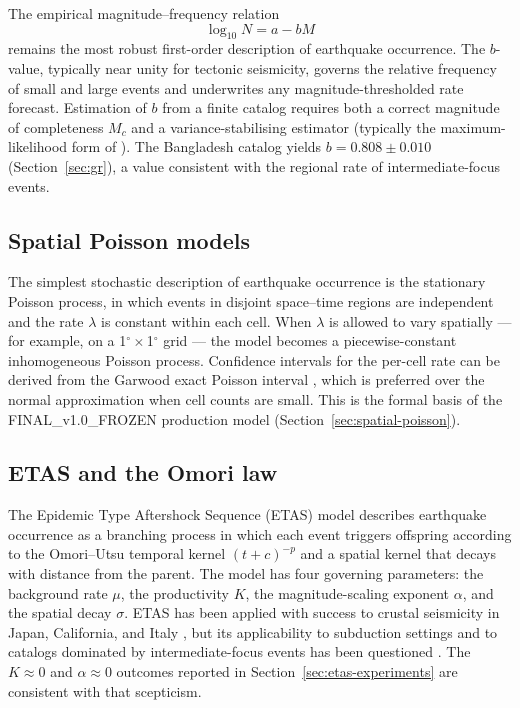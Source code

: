 \documentclass[10pt,a4paper,twocolumn]{article}
\begin{document}
The empirical magnitude--frequency relation
\begin{equation}\label{eq:gr}
\log_{10} N = a - bM
\end{equation}
\cite{gutenberg1944} remains the most robust first-order description of earthquake occurrence. The $b$-value, typically near unity for tectonic seismicity, governs the relative frequency of small and large events and underwrites any magnitude-thresholded rate forecast. Estimation of $b$ from a finite catalog requires both a correct magnitude of completeness $M_c$ and a variance-stabilising estimator (typically the maximum-likelihood form of \cite{aki1965}). The Bangladesh catalog yields $b=0.808\pm0.010$ (Section~\ref{sec:gr}), a value consistent with the regional rate of intermediate-focus events.

\subsection{Spatial Poisson models}

The simplest stochastic description of earthquake occurrence is the stationary Poisson process, in which events in disjoint space--time regions are independent and the rate $\lambda$ is constant within each cell. When $\lambda$ is allowed to vary spatially --- for example, on a 1$^\circ\times$1$^\circ$ grid --- the model becomes a piecewise-constant inhomogeneous Poisson process. Confidence intervals for the per-cell rate can be derived from the Garwood exact Poisson interval \cite{garwood1936}, which is preferred over the normal approximation when cell counts are small. This is the formal basis of the FINAL\_v1.0\_FROZEN production model (Section~\ref{sec:spatial-poisson}).

\subsection{ETAS and the Omori law}

The Epidemic Type Aftershock Sequence (ETAS) model \cite{ogata1988} describes earthquake occurrence as a branching process in which each event triggers offspring according to the Omori--Utsu temporal kernel $(t+c)^{-p}$ and a spatial kernel that decays with distance from the parent. The model has four governing parameters: the background rate $\mu$, the productivity $K$, the magnitude-scaling exponent $\alpha$, and the spatial decay $\sigma$. ETAS has been applied with success to crustal seismicity in Japan, California, and Italy \cite{ogata1988, zhuang2011, marsan2008}, but its applicability to subduction settings and to catalogs dominated by intermediate-focus events has been questioned \cite{hainzl2008}. The $K\approx0$ and $\alpha\approx0$ outcomes reported in Section~\ref{sec:etas-experiments} are consistent with that scepticism.
\end{document}
